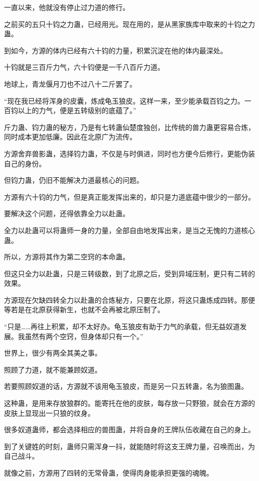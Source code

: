\begin{this_body}
一直以来，他就没有停止过力道的修行。

之前买的五只十钧之力蛊，已经用光。现在用的，是从黑家族库中取来的十钧之力蛊。

到如今，方源的体内已经有六十钧的力量，积累沉淀在他的体内最深处。

十钧就是三百斤力气，六十钧便是一千八百斤力道。

地球上，青龙偃月刀也不过八十二斤罢了。

“现在我已经将浑身的皮囊，炼成龟玉狼皮。这样一来，至少能承载百钧之力。一百钧以上的力气，便是五转级别的底蕴了。”

斤力蛊、钧力蛊的秘方，乃是有七转蛊仙楚度独创，比传统的兽力蛊更容易合炼，同时成本更加低廉。因此在北原广为流传。

方源舍弃兽影蛊，选择钧力蛊，不仅是与时俱进，同时也方便今后修行，更能伪装自己的身份。

但钧力蛊，仍旧不能解决力道最核心的问题。

方源有六十钧的力气，但是真正能发挥出来的，却只是力道底蕴中很少的一部分。

要解决这个问题，还得依靠全力以赴蛊。

全力以赴蛊可以将蛊师一身的力量，全部自由地发挥出来，是当之无愧的力道核心蛊。

所以，方源将其作为第二空窍的本命蛊。

但这只全力以赴蛊，只是三转级数，到了北原之后，受到异域压制，更只有二转的效果。

方源现在欠缺四转全力以赴蛊的合炼秘方，只要在北原，将这只蛊炼成四转。那便等若是在北原获得新生，也就不会再被北原压制了。

“只是……再往上积累，却不太好办。龟玉狼皮有助于力气的承载，但无益奴道发展。我虽然有两个空窍，但身体却只有一个。”

世界上，很少有两全其美之事。

照顾了力道，就不能兼顾奴道。

若要照顾奴道的话，方源就不该用龟玉狼皮，而是另一只五转蛊，名为狼图蛊。

这种蛊，是用来存放狼群的。能寄托在他的皮肤，每存放一只野狼，就会在方源的皮肤上显现出一只狼的纹身。

很多奴道蛊师，都会选择相应的兽图蛊，并将自身的王牌队伍收藏在自己的身上。

到了关键姓的时刻，蛊师只需浑身一抖，就能随时将这支王牌力量，召唤而出，为自己战斗。

就像之前，方源用了四转的无常骨蛊，使得肉身能承担更强的魂魄。


\end{this_body}
